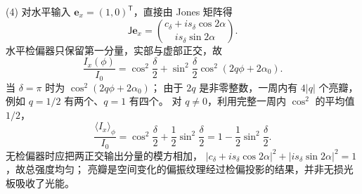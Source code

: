 (4) 对水平输入 \(\mathbf e_x=(1,0)^{\mathsf T}\)，直接由 Jones 矩阵得
\[
\mathsf J\mathbf e_x=
\binom{c_\delta+i s_\delta\cos2\alpha}
{i s_\delta\sin2\alpha}.
\]
水平检偏器只保留第一分量，实部与虚部正交，故
\[
\boxed{\frac{I_x(\phi)}{I_0}
=\cos^2\frac\delta2+
\sin^2\frac\delta2\cos^2(2q\phi+2\alpha_0)}.
\]
当 \(\delta=\pi\) 时为 \(\cos^2(2q\phi+2\alpha_0)\)；
由于 \(2q\) 是非零整数，一周内有 \(\boxed{4|q|}\) 个亮瓣，
例如 \(q=1/2\) 有两个、\(q=1\) 有四个。
对 \(q\ne0\)，利用完整一周内 \(\cos^2\) 的平均值 \(1/2\)，
\[
\boxed{\frac{\langle I_x\rangle_\phi}{I_0}
=\cos^2\frac\delta2+\frac12\sin^2\frac\delta2
=1-\frac12\sin^2\frac\delta2}.
\]
无检偏器时应把两正交输出分量的模方相加，
\(|c_\delta+i s_\delta\cos2\alpha|^2+
|i s_\delta\sin2\alpha|^2=1\)，故总强度均匀；
亮瓣是空间变化的偏振纹理经过检偏投影的结果，并非无损光板吸收了光能。
